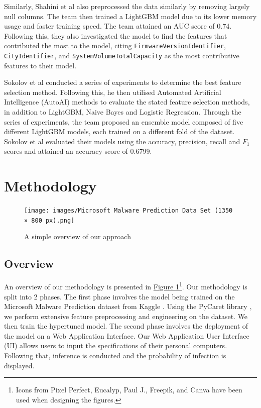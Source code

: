 \documentclass[pdflatex,sn-basic,Numbered]{sn-jnl}%
\theoremstyle{thmstyleone}%
\theoremstyle{thmstyletwo}%
\theoremstyle{thmstylethree}%
\newcommand{\reffig}[1]{\hyperref[#1]{Figure \ref*{#1}}}
\begin{document}
Similarly, Shahini et al \cite{shahini2019} also preprocessed the data similarly by removing largely null columns. The team then trained a LightGBM model due to its lower memory usage and faster training speed. The team attained an AUC score of 0.74. Following this, they also investigated the model to find the features that contributed the most to the model, citing \texttt{FirmwareVersionIdentifier}, \texttt{CityIdentifier},  and \texttt{SystemVolumeTotalCapacity} as the most contributive features to their model.

Sokolov et al \cite{sokolov2021} conducted a series of experiments to determine the best feature selection method. Following this, he then utilised Automated Artificial Intelligence (AutoAI) methods to evaluate the stated feature selection methods, in addition to LightGBM, Naive Bayes and Logistic Regression. Through the series of experiments, the team proposed an ensemble model composed of five different LightGBM models, each trained on a different fold of the dataset. Sokolov et al evaluated their models using the accuracy, precision, recall and $F_1$ scores and attained an accuracy score of 0.6799.

\section{Methodology}

\begin{figure}[h]
\texttt{[image: images/Microsoft Malware Prediction Data Set (1350 × 800 px).png]}
\centering
\caption{A simple overview of our approach}
\label{Fig 1}
\end{figure}
\subsection{Overview}
An overview of our methodology is presented in \reffig{Fig 1}\footnote[1]{Icons from Pixel Perfect, Eucalyp, Paul J., Freepik, and Canva have been used when designing the figures.}. Our methodology is split into 2 phases. The first phase involves the model being trained on the Microsoft Malware Prediction dataset from Kaggle \cite{microsoft-malware-prediction}. Using the PyCaret library \cite{pycaret}, we perform extensive feature preprocessing and engineering on the dataset. We then train the hypertuned model. The second phase involves the deployment of the model on a Web Application Interface. Our Web Application User Interface (UI) allows users to input the specifications of their personal computers. Following that, inference is conducted and the probability of infection is displayed.
\end{document}
